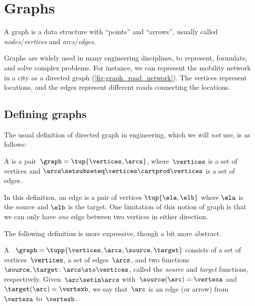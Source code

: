 
\section{Graphs}

A graph is a data structure with ``points'' and ``arrows'', usually called \emph{no\-des}/\emph{ver\-tices} and \emph{arcs}/\emph{edges}.

\begin{marginfigure}
    \caption{}
    \label{fig:graph_road_network}
\end{marginfigure}


Graphs are widely used in many engineering disciplines, to represent, formulate, and solve complex problems.
For instance, we can represent the mobility network in a city as a directed graph (\cref{fig:graph_road_network}).
The vertices represent locations, and the edges represent different roads connecting the locations.

\subsection{Defining graphs}

The usual definition of directed graph in engineering, which we will \emph{not} use, is as follows:

\begin{definition}
    \label{def:directed-graph}
    A \emph{} is a pair~$\graph=\tup{\vertices, \arcs}$, where~$\vertices$ is
    a set of vertices and $\arcs \setsubseteq \vertices \cartprod \vertices$ is a set of edges.
\end{definition}
In this definition, an edge is a pair of vertices $\tup{\ela,\elb}$ where $\ela$ is the source and $\elb$ is the target.
One limitation of this notion of graph is that we can only have \emph{one} edge between two vertices in either direction.

The following definition is more expressive, though a bit more abstract.

\begin{definition}
    \label{def:Graph}
    A \emph{}~$\graph=\tupp{\vertices,\arcs, \source,\target}$ consists of a set of vertices~$\vertices$, a set of edges~$\arcs$, and two functions~$\source,\target \colon \arcs \sto \vertices$, called the \emph{source} and \emph{target} functions, respectively.
    Given~$\arc\setin \arcs$ with~$\source(\arc)=\vertexa$ and~$\target(\arc)=\vertexb$, we say that~$\arc$ is an edge (or arrow) from~$\vertexa$ to~$\vertexb$.
\end{definition}

